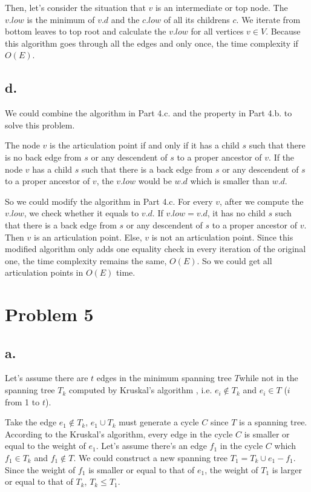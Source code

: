 \documentclass[twoside,11pt]{homework}
\begin{document}
Then, let's consider the situation that $v$ is an intermediate or top node.
The $v.low$ is the minimum of $v.d$ and the $c.low$ of all its childrens $c$.
We iterate from bottom leaves to top root and calculate the $v.low$ for all vertices $v \in V$.
Because this algorithm goes through all the edges and only once, the time complexity if $O(E)$.

\subsection*{d.}
We could combine the algorithm in Part 4.c. and the property in Part 4.b. to solve this problem.

The node $v$ is the articulation point if and only if it has a child $s$ such that there is no back edge from $s$ or any descendent of $s$ to a proper ancestor of $v$.
If the node $v$ has a child $s$ such that there is a back edge from $s$ or any descendent of $s$ to a proper ancestor of $v$, the $v.low$ would be $w.d$ which is smaller than $w.d$.

So we could modify the algorithm in Part 4.c.
For every $v$, after we compute the $v.low$, we check whether it equals to $v.d$.
If $v.low = v.d$,  it has no child $s$ such that there is a back edge from $s$ or any descendent of $s$ to a proper ancestor of $v$.
Then $v$ is an articulation point.
Else, $v$ is not an articulation point.
Since this modified algorithm only adds one equality check in every iteration of the original one, the time complexity remains the same, $O(E)$.
So we could get all articulation points in $O(E)$ time.


\section*{Problem 5}
\subsection*{a.}
Let's assume there are $t$ edges in the minimum spanning tree $T$while  not  in the spanning tree $T_k$ computed by Kruskal's algorithm , i.e. $e_i \notin T_k$ and $e_i \in T$ ($i$ from 1 to $t$). 

Take the edge $e_1 \notin T_k$,  $e_1 \cup T_k$ must generate a cycle $C$ since $T$ is a spanning tree.
According to the Kruskal's algorithm, every edge in the cycle $C$ is smaller or equal to the weight of $e_1$. 
Let's assume there's an edge $f_1$ in the cycle $C$ which $f_1 \in T_k$ and $f_1 \notin T$.
We could construct a new spanning tree $T_1 = T_k \cup e_1 - f_1$.
Since the weight of $f_1$ is smaller or equal to that of $e_1$, the weight of $T_1$ is larger or equal to that of $T_k$, $T_k \le T_1$.
\end{document}
